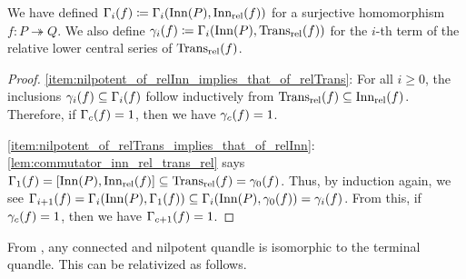 We have defined $\Gamma_{i}(f)\coloneqq \Gamma_i(\operatorname{Inn}(P),\operatorname{Inn_{rel}}(f))$ for a surjective homomorphism $f\colon P \twoheadrightarrow Q$. We also define $\gamma_{i}(f)\coloneqq\Gamma_{i}(\operatorname{Inn}(P),\operatorname{Trans_{rel}}(f))$ for the $i$-th term of the relative lower central series of $\operatorname{Trans_{rel}}(f)$.




\begin{proof}
\eqref{item:nilpotent_of_relInn_implies_that_of_relTrans}: For all $i\geq 0$, the inclusions $\gamma_{i}(f)\subseteq \Gamma_{i}(f)$ follow inductively from $\operatorname{Trans_{rel}}(f)\subseteq \operatorname{Inn_{rel}}(f)$. Therefore, if $\Gamma_{c}(f)=1$, then we have $\gamma_{c}(f)=1$.

\eqref{item:nilpotent_of_relTrans_implies_that_of_relInn}: \cref{lem:commutator_inn_rel_trans_rel} says $\Gamma_{1}(f)=[\operatorname{Inn}(P),\operatorname{Inn_{rel}}(f)]\subseteq \operatorname{Trans_{rel}}(f)=\gamma_{0}(f)$. Thus, by induction again, we see $\Gamma_{i+1}(f)=\Gamma_i(\operatorname{Inn}(P),\Gamma_{1}(f)) \subseteq \Gamma_i(\operatorname{Inn}(P),\gamma_{0}(f))=\gamma_{i}(f)$.
From this, if $\gamma_{c}(f)=1$, then we have $\Gamma_{c+1}(f)=1$.
\end{proof}

From \cite[Corollary 3.7]{darne_2026_nilpotent_quandles}, any connected and nilpotent quandle is isomorphic to the terminal quandle. This can be relativized as follows.


